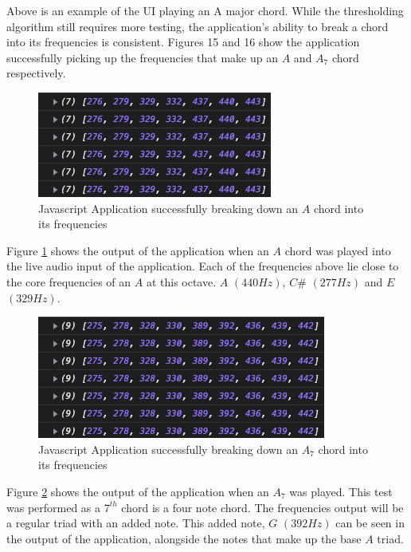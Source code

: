 \documentclass[12pt,a4paper]{article}
\begin{document}
	Above is an example of the UI playing an A major chord.
\newpage
\vspace*{5mm}
		While the thresholding algorithm still requires more testing, the application's ability to break a chord
		into its frequencies is consistent. Figures 15 and 16 show the application successfully 
		picking up the frequencies that make up an $A$ and $A_{7}$ chord respectively.\\
		\begin{figure}[H]
			\begin{center}
					\includegraphics[width=0.7\linewidth]{A_Chord_Javascript}					
			\end{center}
			\caption{Javascript Application successfully breaking down an $A$ chord into its frequencies}
			\label{fig:A_Chord_Javascript}
		\end{figure}
		Figure \ref{fig:A_Chord_Javascript} shows the output of the application when an $A$ chord was played into the live audio 
		input of the application. Each of the frequencies above lie close to the core frequencies of an $A$ at this
		octave. $A$ $(440Hz)$, $C\#$ $(277Hz)$ and $E$ $(329Hz)$. 
		\begin{figure}[H]
			\begin{center}
				\includegraphics[width=0.7\linewidth]{A7_Chord_Javascript}
			\end{center}
			\caption{Javascript Application successfully breaking down an $A_{7}$ chord into its frequencies}
			\label{fig:A7_Chord_Javascript}
		\end{figure}
		Figure \ref{fig:A7_Chord_Javascript} shows the output of the application when an $A_{7}$ was played. This test was performed
		as a $7^{th}$ chord is a four note chord. The frequencies output will be a regular triad with an added
		note. This added note, $G$ $(392Hz)$ can be seen in the output of the application, alongside the notes
		that make up the base $A$ triad.
\newpage
\end{document}
